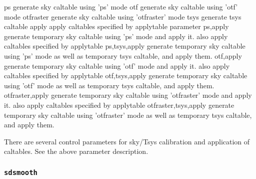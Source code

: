     ps
        generate sky caltable using 'ps' mode
    otf
        generate sky caltable using 'otf' mode
    otfraster
        generate sky caltable using 'otfraster' mode
    tsys
        generate tsys caltable
    apply
        apply caltables specified by applytable parameter
    ps,apply
        generate temporary sky caltable using 'ps' mode and
        apply it. also apply caltables specified by applytable 
    ps,tsys,apply
        generate temporary sky caltable using 'ps' mode as well
        as temporary tsys caltable, and apply them. 
    otf,apply
        generate temporary sky caltable using 'otf' mode and
        apply it. also apply caltables specified by applytable 
    otf,tsys,apply
        generate temporary sky caltable using 'otf' mode as well
        as temporary tsys caltable, and apply them. 
    otfraster,apply
        generate temporary sky caltable using 'otfraster' mode
        and apply it. also apply caltables specified by applytable 
    otfraster,tsys,apply
        generate temporary sky caltable using 'otfraster' mode
        as well as temporary tsys caltable, and apply them. 

There are several control parameters for sky/Tsys calibration and 
application of caltables. See the above parameter description.

\subsubsection{{\tt sdsmooth}}
\label{section:sd.sdtasks.tasks.sdsmooth}

